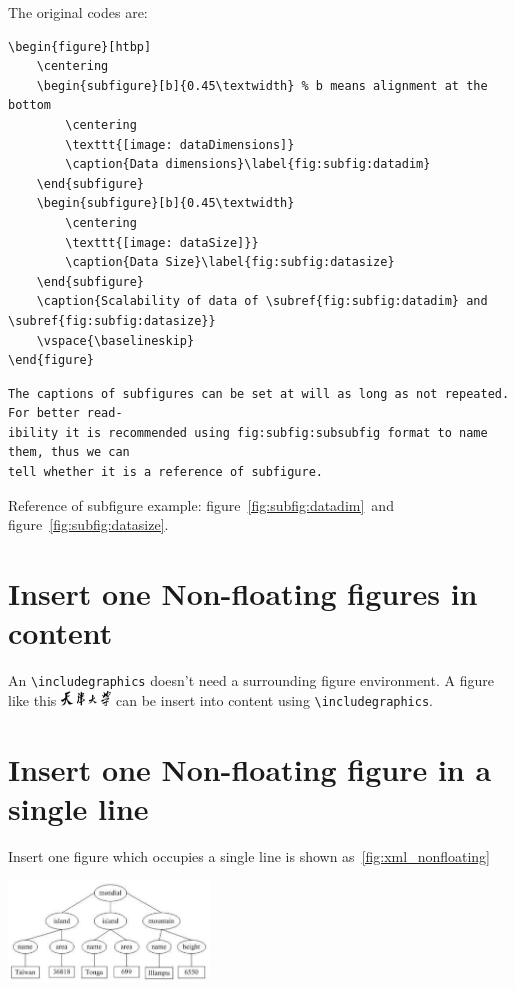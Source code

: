 The original codes are:

\begin{lstlisting}[language={[LaTeX]TeX}]
\begin{figure}[htbp]
	\centering
	\begin{subfigure}[b]{0.45\textwidth} % b means alignment at the bottom
		\centering
		\texttt{[image: dataDimensions]}
		\caption{Data dimensions}\label{fig:subfig:datadim}
	\end{subfigure}
	\begin{subfigure}[b]{0.45\textwidth}
		\centering
		\texttt{[image: dataSize]}}
		\caption{Data Size}\label{fig:subfig:datasize}
	\end{subfigure}
	\caption{Scalability of data of \subref{fig:subfig:datadim} and \subref{fig:subfig:datasize}}
	\vspace{\baselineskip}
\end{figure}
\end{lstlisting}

\begin{lstlisting}[language={[LaTeX]TeX}]
The captions of subfigures can be set at will as long as not repeated. For better read-
ibility it is recommended using fig:subfig:subsubfig format to name them, thus we can 
tell whether it is a reference of subfigure.
\end{lstlisting}

Reference of subfigure example: figure~\ref{fig:subfig:datadim}~and figure~\ref{fig:subfig:datasize}.

\section{Insert one Non-floating figures in content}
An \verb|\includegraphics| doesn't need a surrounding figure environment. A figure like this \includegraphics[width=0.1\textwidth]{figures/tju.pdf} can be insert into content using \verb|\includegraphics|.

\section{Insert one Non-floating figure in a single line}
Insert one figure which occupies a single line is shown as~\ref{fig:xml_nonfloating}
\begin{center}
	\includegraphics[width=0.4\textwidth]{figures/XML.pdf}
	\label{fig:xml_nonfloating}
	\vspace{\baselineskip}
\end{center}

